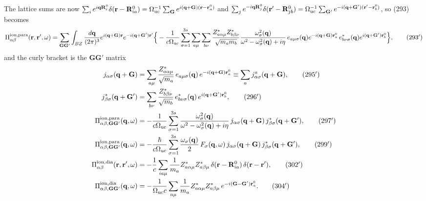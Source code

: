 The lattice sums are now
$\sum_ie^{i\mathbf q\mathbf R^0_i}\delta(\mathbf r-\mathbf R^0_{ia})=\Omega_{\rm uc}^{-1}\sum_{\mathbf G}e^{i(\mathbf q+\mathbf G)(\mathbf r-\mathbf r^0_a)}$ and
$\sum_je^{-i\mathbf q\mathbf R^0_j}\delta(\mathbf r'-\mathbf R^0_{jb})=\Omega_{\rm uc}^{-1}\sum_{\mathbf G'}e^{-i(\mathbf q+\mathbf G')(\mathbf r'-\mathbf r^0_b)}$, so (293) becomes
\begin{equation}
\Pi^{\rm ion,para}_{\alpha\beta}(\mathbf r,\mathbf r',\omega)=\sum_{\mathbf G\mathbf G'}\int_{BZ}\frac{d\mathbf q}{(2\pi)^3}e^{i(\mathbf q+\mathbf G)\mathbf r}e^{-i(\mathbf q+\mathbf G')\mathbf r'}\Big\{-\frac{1}{c\Omega_{\rm uc}}\sum_{\sigma=1}^{3s}\sum_{a\mu}\sum_{b\nu}\frac{Z^*_{a\alpha\mu}Z^*_{b\beta\nu}}{\sqrt{m_am_b}}\frac{\omega^2_\sigma(\mathbf q)}{\omega^2-\omega^2_\sigma(\mathbf q)+i\eta}\,e_{a\mu\sigma}(\mathbf q)e^{-i(\mathbf q+\mathbf G)\mathbf r^0_a}\,e^*_{b\nu\sigma}(\mathbf q)e^{i(\mathbf q+\mathbf G')\mathbf r^0_b}\Big\},
\tag{293$'$}
\end{equation}
and the curly bracket is the $\mathbf G\mathbf G'$ matrix
\begin{align}
j_{\alpha\sigma}(\mathbf q+\mathbf G)&=\sum_{a\mu}\frac{Z^*_{a\alpha\mu}}{\sqrt{m_a}}\,e_{a\mu\sigma}(\mathbf q)\,e^{-i(\mathbf q+\mathbf G)\mathbf r^0_a}\equiv\sum_a j^a_{\alpha\sigma}(\mathbf q+\mathbf G),\tag{295$'$}\\
j^*_{\beta\sigma}(\mathbf q+\mathbf G')&=\sum_{b\nu}\frac{Z^*_{b\beta\nu}}{\sqrt{m_b}}\,e^*_{b\nu\sigma}(\mathbf q)\,e^{i(\mathbf q+\mathbf G')\mathbf r^0_b},\tag{296$'$}\\
\Pi^{\rm ion,para}_{\alpha\beta,\mathbf G\mathbf G'}(\mathbf q,\omega)&=-\frac{1}{c\Omega_{\rm uc}}\sum_{\sigma=1}^{3s}\frac{\omega^2_\sigma(\mathbf q)}{\omega^2-\omega^2_\sigma(\mathbf q)+i\eta}\,j_{\alpha\sigma}(\mathbf q+\mathbf G)\,j^*_{\beta\sigma}(\mathbf q+\mathbf G'),\tag{297$'$}\\
\Pi^{\rm ion,para}_{\alpha\beta,\mathbf G\mathbf G'}(\mathbf q,\omega)&=-\frac{\hbar}{c\Omega_{\rm uc}}\sum_{\sigma=1}^{3s}\frac{\omega_\sigma(\mathbf q)}{2}\,F_\sigma(\mathbf q,\omega)\,j_{\alpha\sigma}(\mathbf q+\mathbf G)\,j^*_{\beta\sigma}(\mathbf q+\mathbf G'),\tag{299$'$}\\
\Pi^{\rm ion,dia}_{\alpha\beta}(\mathbf r,\mathbf r',\omega)&=-\frac1c\sum_{ia\mu}\frac{1}{m_a}Z^*_{a\alpha\mu}Z^*_{a\beta\mu}\,\delta(\mathbf r-\mathbf R^0_{ia})\,\delta(\mathbf r-\mathbf r'),\tag{302$'$}\\
\Pi^{\rm ion,dia}_{\alpha\beta,\mathbf G\mathbf G'}(\mathbf q,\omega)&=-\frac{1}{\Omega_{\rm uc}c}\sum_{a\mu}\frac{1}{m_a}Z^*_{a\alpha\mu}Z^*_{a\beta\mu}\,e^{-i(\mathbf G-\mathbf G')\mathbf r^0_a}.\tag{304$'$}
\end{align}
